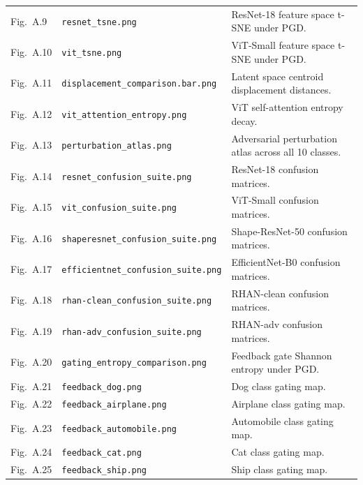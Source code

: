 \documentclass[12pt,a4paper]{article}
\begin{document}
\begin{longtable}{>{\raggedright\arraybackslash}p{2.1cm} >{\raggedright\arraybackslash}p{5.2cm} >{\raggedright\arraybackslash}p{\dimexpr\textwidth-2.1cm-5.2cm-4\tabcolsep\relax}}
\midrule
Fig.~A.9 & \texttt{resnet\_\allowbreak{}tsne.png} &
ResNet-18 feature space t-SNE under PGD. \\
Fig.~A.10 & \texttt{vit\_\allowbreak{}tsne.png} &
ViT-Small feature space t-SNE under PGD. \\
Fig.~A.11 & \texttt{displacement\_\allowbreak{}comparison.bar.png} &
Latent space centroid displacement distances. \\
Fig.~A.12 & \texttt{vit\_\allowbreak{}attention\_\allowbreak{}entropy.png} &
ViT self-attention entropy decay. \\
Fig.~A.13 & \texttt{perturbation\_\allowbreak{}atlas.png} &
Adversarial perturbation atlas across all 10 classes. \\
\midrule
Fig.~A.14 & \texttt{resnet\_\allowbreak{}confusion\_\allowbreak{}suite.png} &
ResNet-18 confusion matrices. \\
Fig.~A.15 & \texttt{vit\_\allowbreak{}confusion\_\allowbreak{}suite.png} &
ViT-Small confusion matrices. \\
Fig.~A.16 & \texttt{shaperesnet\_\allowbreak{}confusion\_\allowbreak{}suite.png} &
Shape-ResNet-50 confusion matrices. \\
Fig.~A.17 & \texttt{efficientnet\_\allowbreak{}confusion\_\allowbreak{}suite.png} &
EfficientNet-B0 confusion matrices. \\
Fig.~A.18 & \texttt{rhan-\allowbreak{}clean\_\allowbreak{}confusion\_\allowbreak{}suite.png} &
RHAN-clean confusion matrices. \\
Fig.~A.19 & \texttt{rhan-\allowbreak{}adv\_\allowbreak{}confusion\_\allowbreak{}suite.png} &
RHAN-adv confusion matrices. \\
\midrule
Fig.~A.20 & \texttt{gating\_\allowbreak{}entropy\_\allowbreak{}comparison.png} &
Feedback gate Shannon entropy under PGD. \\
Fig.~A.21 & \texttt{feedback\_\allowbreak{}dog.png} &
Dog class gating map. \\
Fig.~A.22 & \texttt{feedback\_\allowbreak{}airplane.png} &
Airplane class gating map. \\
Fig.~A.23 & \texttt{feedback\_\allowbreak{}automobile.png} &
Automobile class gating map. \\
Fig.~A.24 & \texttt{feedback\_\allowbreak{}cat.png} &
Cat class gating map. \\
Fig.~A.25 & \texttt{feedback\_\allowbreak{}ship.png} &
Ship class gating map. \\
\midrule

\end{longtable}
\end{document}
